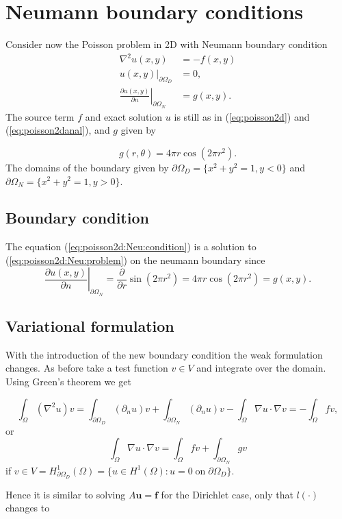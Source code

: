 \documentclass[paper=a4, fontsize=11pt]{scrartcl} %
\begin{document}
\section{Neumann boundary conditions}
Consider now the Poisson problem in 2D with Neumann boundary condition
\begin{equation}
\begin{aligned}
\nabla^2u(x,y) 	&= -f(x,y) \\
\left. u(x,y)\right|_{\partial\Omega_D} 	&= 0, \\
\left. \frac{\partial u(x,y)}{\partial n}\right|_{\partial\Omega_N} &= g(x,y).
\end{aligned}
\label{eq:poisson2d:Neu:problem}
\end{equation}
The source term $f$ and exact solution $u$ is still as in (\ref{eq:poisson2d}) and (\ref{eq:poisson2danal}), and $g$ given by

\begin{equation}
g(r,\theta) =4\pi r\cos(2\pi r^2).
\label{eq:poisson2d:Neu:condition}
\end{equation}
The domains of the boundary given by $\partial\Omega_D = \{x^2+y^2=1,y<0\}$ and $\partial\Omega_N = \{x^2+y^2=1,y>0\}$.

\subsection{Boundary condition}
The equation (\ref{eq:poisson2d:Neu:condition}) is a solution to (\ref{eq:poisson2d:Neu:problem}) on the neumann boundary since
\[\left. \frac{\partial u(x,y)}{\partial n}\right|_{\partial\Omega_N} = \frac{\partial}{\partial r} \sin(2\pi r^2) = 4\pi r\cos(2\pi r^2) = g(x,y).\]
\subsection{Variational formulation}
With the introduction of the new boundary condition the weak formulation changes. As before take a test function $v\in V$ and integrate over the domain. Using Green's theorem we get

\[\int_{\Omega}  (\nabla^2u)v = \int_{\partial\Omega_D} (\partial_n u) v + \int_{\partial\Omega_N} (\partial_n u) v-\int_{\Omega} \nabla u \cdot \nabla v = -\int_{\Omega} f v,\]
or 
\[\int_{\Omega} \nabla u \cdot \nabla v = \int_{\Omega} f v +  \int_{\partial\Omega_N} \! g v\]
if $v\in V= H^1_{\partial\Omega_D}(\Omega) = \{u\in H^1(\Omega) : u=0 \; \mathrm{on} \;  \partial\Omega_D\}$.

Hence it is similar to solving $A\mathbf{u}=\mathbf{f}$ for the Dirichlet case, only that $l(\cdot)$ changes to
\end{document}
